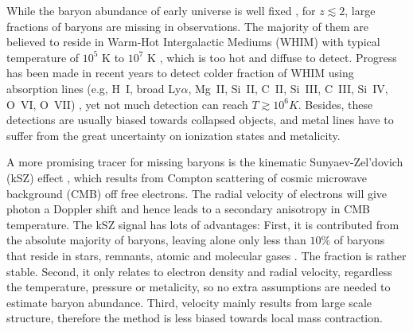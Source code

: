 While the baryon abundance of early universe is well fixed 
\cite{Cooke14,Fukugita98,Komatsu11,Hinshaw13}, 
for $z\lesssim 2$, large fractions of baryons are missing in observations.  
The majority of them are believed to reside in Warm-Hot Intergalactic Mediums (WHIM) with typical temperature of $10^5$ K to $10^7$ K \cite{Pen1999,Soltan06}, which is too hot and diffuse to detect.
Progress has been made in recent years to detect colder fraction of WHIM using absorption lines 
(e.g, H~I, broad Ly$\alpha$, Mg~II, Si~II, C~II, Si~III, C~III, Si~IV, O~VI, O~VII) \cite{Bregman07,Werk14}, 
yet not much detection can reach $T\gtrsim 10^6 K$. 
Besides, these detections are usually biased towards collapsed objects, 
 and metal lines have to suffer from the great uncertainty on ionization states 
and metalicity.

A more promising tracer for missing baryons is the kinematic Sunyaev-Zel'dovich (kSZ) effect \cite{Sunyaev72,Sunyaev80,Vishniac87}, 
which results from Compton scattering of cosmic microwave background (CMB) off free electrons. 
The radial velocity of electrons will give photon a Doppler shift 
and hence leads to a 
secondary anisotropy in CMB temperature.
The kSZ signal has lots of advantages: 
First, it is contributed from the absolute majority of baryons, 
leaving alone only less than $10\%$ of baryons that 
reside in stars, remnants, atomic and molecular gases \cite{Fukugita04}. 
The fraction is rather stable.  
Second, it only relates to electron density and radial velocity, 
regardless the temperature, pressure or metalicity,  
so no extra assumptions are needed to estimate baryon abundance.  
Third, velocity mainly results from large scale structure, 
therefore the method is less biased towards local mass contraction.  

